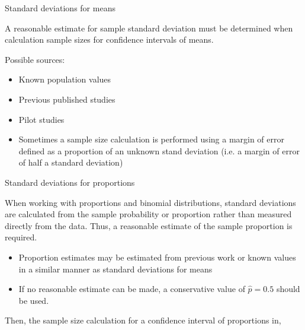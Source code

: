 \documentclass[xcolor=table, aspectratio=169, bigger, handout]{beamer}
\begin{document}
\begin{frame}{Standard deviations for means}
\begin{block}{}
A reasonable estimate for sample standard deviation must be determined when calculation sample sizes for confidence intervals of means.\\ \medskip

Possible sources:
\begin{itemize}
\pause \item Known population values

\pause\item Previous published studies

\pause\item Pilot studies

\pause \item Sometimes a sample size calculation is performed using a margin of error defined as a proportion of an unknown stand deviation (i.e. a margin of error of half a standard deviation)
\end{itemize}

\end{block}
\end{frame}

\begin{frame}{Standard deviations for proportions}
\begin{block}{}
When working with proportions and binomial distributions, standard deviations are calculated from the sample probability or proportion rather than measured directly from the data. Thus, a reasonable estimate of the sample proportion is required.\\ \medskip

\begin{itemize}
\pause \item Proportion estimates may be estimated from previous work or known values in a similar manner as standard deviations for means

\pause\item If no reasonable estimate can be made, a conservative value of $\hat p = 0.5$ should be used.
\end{itemize}

Then, the sample size calculation for a confidence interval of proportions in,\\ \smallskip

\end{block}
\end{frame}
\end{document}
